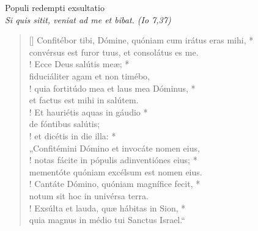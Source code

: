 


\def\greinitialformat#1{%
{\fontsize{39}{39}\selectfont #1}%
}




\vspace{0.3cm}
\begin{center}

Populi redempti exsultatio\\
\textit{\small Si quis sitit, veniat ad me et bibat. (Io 7,37)}
\end{center}
\begin{verse}[\versewidth]
Confitébor tibi, Dómine, quóniam cum irátus eras mihi, *\\
convérsus est furor tuus, et consolátus es me.\\!
\vin Ecce Deus salútis meæ; *\\
\vin fiduciáliter agam et non timébo,\\!
quia fortitúdo mea et laus mea Dóminus, *\\
et factus est mihi in salútem.\\!
\vin Et hauriétis aquas in gáudio *\\
\vin de fóntibus salútis;\\!
et dicétis in die illa: *\\
„Confitémini Dómino et invocáte nomen eius,\\!
\vin notas fácite in pópulis adinventiónes eius; *\\
\vin mementóte quóniam excélsum est nomen eius.\\!
Cantáte Dómino, quóniam magnífice fecit, *\\
notum sit hoc in univérsa terra.\\!
\vin Exsúlta et lauda, quæ hábitas in Sion, *\\
\vin quia magnus in médio tui Sanctus Israel.“\\
\end{verse}
\vspace{1cm}


